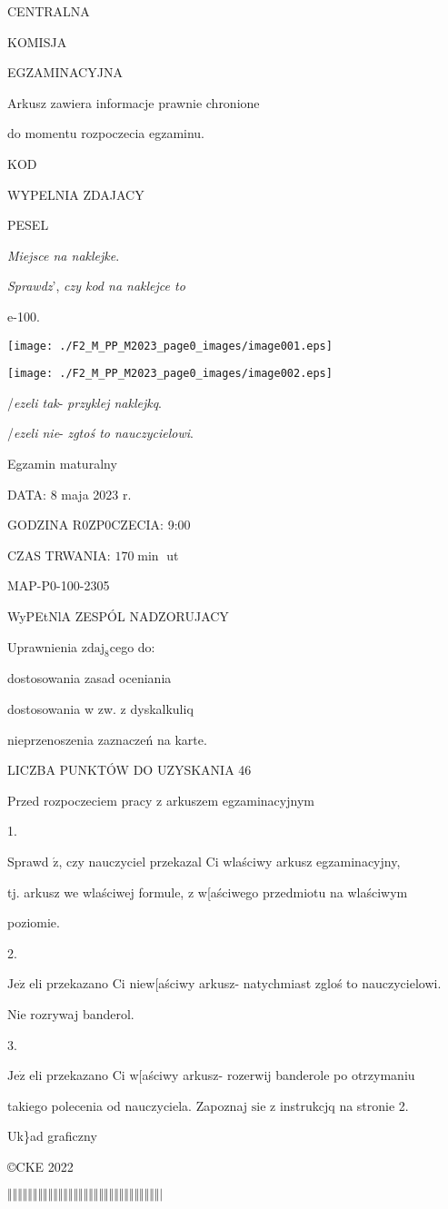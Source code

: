 \documentclass[a4paper,12pt]{article}
\begin{document}
CENTRALNA

KOMISJA

EGZAMINACYJNA

Arkusz zawiera informacje prawnie chronione

do momentu rozpoczecia egzaminu.

KOD

WYPELNIA ZDAJACY

PESEL

{\it Miejsce na naklejke}.

{\it Sprawdz}', {\it czy kod na naklejce to}

e-100.
\begin{center}
\texttt{[image: ./F2\_M\_PP\_M2023\_page0\_images/image001.eps]}

\texttt{[image: ./F2\_M\_PP\_M2023\_page0\_images/image002.eps]}
\end{center}
/{\it ezeli tak}- {\it przyklej naklejkq}.

/{\it ezeli nie}- {\it zgtoś to nauczycielowi}.

Egzamin maturalny

DATA: 8 maja 2023 r.

GODZINA R0ZP0CZECIA: 9:00

CZAS TRWANIA: $170 \displaystyle \min$ ut

MAP-P0-100-2305

WyPEtNlA ZESPÓL NADZORUJACY

Uprawnienia $\mathrm{z}\mathrm{d}\mathrm{a}\mathrm{j}_{8}$cego do:

\fbox{} dostosowania zasad oceniania

\fbox{} dostosowania w zw. z dyskalkuliq

\fbox{} nieprzenoszenia zaznaczeń na karte.

LICZBA PUNKTÓW DO UZYSKANIA 46

Przed rozpoczeciem pracy z arkuszem egzaminacyjnym

1.

Sprawd $\acute{\mathrm{z}}$, czy nauczyciel przekazal Ci wlaściwy arkusz egzaminacyjny,

tj. arkusz we wlaściwej formule, z w[aściwego przedmiotu na wlaściwym

poziomie.

2.

$\mathrm{J}\mathrm{e}\dot{\mathrm{z}}$ eli przekazano Ci niew[aściwy arkusz- natychmiast zgloś to nauczycielowi.

Nie rozrywaj banderol.

3.

$\mathrm{J}\mathrm{e}\dot{\mathrm{z}}$ eli przekazano Ci w[aściwy arkusz- rozerwij banderole po otrzymaniu

takiego polecenia od nauczyciela. Zapoznaj $\mathrm{s}\mathrm{i}\mathrm{e}$ z instrukcjq na stronie 2.

Uk\}ad graficzny

\copyright CKE 2022

$\Vert\Vert\Vert\Vert\Vert\Vert\Vert\Vert\Vert\Vert\Vert\Vert\Vert\Vert\Vert\Vert\Vert\Vert\Vert\Vert\Vert\Vert\Vert\Vert\Vert\Vert\Vert\Vert\Vert\Vert|$
\end{document}
